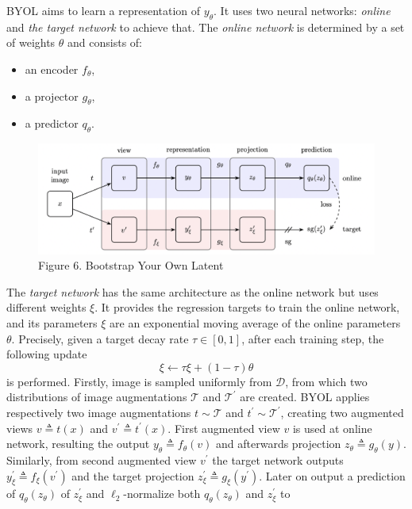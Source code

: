 \documentclass[
]{krantz}
\providecommand{\tightlist}{%
  \setlength{\itemsep}{0pt}\setlength{\parskip}{0pt}}
\begin{document}
BYOL aims to learn a representation of \(y_\theta\). It uses two neural networks: \emph{online} and \emph{the target network} to achieve that. The \emph{online network} is determined by a set of weights \(\theta\) and consists of:

\begin{itemize}
\tightlist
\item
  an encoder \(f_\theta\),
\item
  a projector \(g_\theta\),
\item
  a predictor \(q_\theta\).
\end{itemize}

\begin{figure}

{\centering \includegraphics[width=0.8\linewidth]{./figures/01-chapter1/BYOL} 

}

\caption{Figure 6. Bootstrap Your Own Latent}\label{fig:ch01-figure06}
\end{figure}

The \emph{target network} has the same architecture as the online network but uses different weights \(\xi\). It provides the regression targets to train the online network, and its parameters \(\xi\) are an exponential moving average of the online parameters \(\theta\). Precisely, given a target decay rate \(\tau \in[0,1]\), after each training step, the following update
\begin{equation}
\tag{8}
\xi \leftarrow \tau \xi+(1-\tau) \theta
\end{equation}
is performed.
Firstly, image is sampled uniformly from \(\mathcal{D}\), from which two distributions of image augmentations \(\mathcal{T}\) and \(\mathcal{T}^{\prime}\) are created. BYOL applies respectively two image augmentations \(t \sim \mathcal{T}\) and \(t^{\prime} \sim \mathcal{T}^{\prime}\), creating two augmented views \(v \triangleq t(x)\) and \(v^{\prime} \triangleq t^{\prime}(x)\). First augmented view \(v\) is used at online network, resulting the output \(y_{\theta} \triangleq f_{\theta}(v)\) and afterwards projection \(z_{\theta} \triangleq g_{\theta}(y)\). Similarly, from second augmented view \(v^{\prime}\) the target network outputs \(y_{\xi}^{\prime} \triangleq f_{\xi}(v^{\prime})\) and the target projection \(z_{\xi}^{\prime} \triangleq g_{\xi}(y^{\prime})\). Later on output a prediction of \(q_{\theta}\left(z_{\theta}\right)\) of \(z_{\xi}^{\prime}\) and \(\ell_{2}\)-normalize both \(q_{\theta}\left(z_{\theta}\right)\) and \(z_{\xi}^{\prime}\) to
\end{document}
